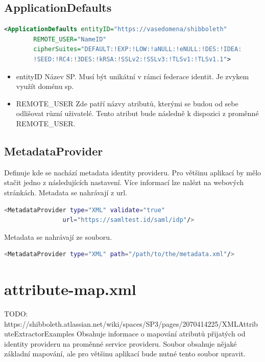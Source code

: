 \subsection{ApplicationDefaults}
\begin{lstlisting}[language=xml]
<ApplicationDefaults entityID="https://vasedomena/shibboleth"
        REMOTE_USER="NameID"
        cipherSuites="DEFAULT:!EXP:!LOW:!aNULL:!eNULL:!DES:!IDEA:
        !SEED:!RC4:!3DES:!kRSA:!SSLv2:!SSLv3:!TLSv1:!TLSv1.1">
\end{lstlisting}
\begin{itemize}
    \item entityID \linebreak
    Název SP. Musí být unikátní v rámci federace identit. Je zvykem využít doménu sp.  
    \item REMOTE\_USER \linebreak
    Zde patří názvy atributů, kterými se budou od sebe odlišovat různí uživatelé. 
    Tento atribut bude následně k dispozici z proměnné REMOTE\_USER.
\end{itemize}
\subsection{MetadataProvider}
Definuje kde se nachází metadata identity provideru. Pro většinu aplikací by mělo stačit jedno z následujících nastavení. Více informací lze nalézt na webových stránkách\cite{MetadataProvider}.
\linebreak \linebreak
Metadata se nahrávají z url.
\begin{lstlisting}[language=Bash]
 <MetadataProvider type="XML" validate="true"
                url="https://samltest.id/saml/idp"/>
\end{lstlisting}
Metadata se nahrávají ze souboru.
\begin{lstlisting}[language=Bash]
 <MetadataProvider type="XML" path="/path/to/the/metadata.xml"/>
\end{lstlisting}


\section{attribute-map.xml}
TODO: https://shibboleth.atlassian.net/wiki/spaces/SP3/pages/2070414225/XMLAttributeExtractorExamples
Obsahuje informace o mapování atributů přijatých od identity provideru na proměnné service provideru. Soubor obsahuje nějaké základní mapování, ale pro většinu aplikací bude nutné tento soubor upravit.

